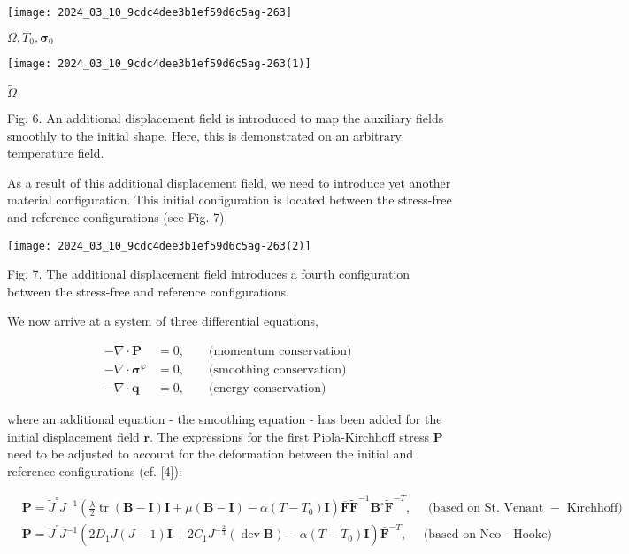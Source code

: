 \documentclass[10pt]{article}
\begin{document}
\begin{center}
\texttt{[image: 2024\_03\_10\_9cdc4dee3b1ef59d6c5ag-263]}
\end{center}

$\Omega, T_{0}, \boldsymbol{\sigma}_{0}$

\begin{center}
\texttt{[image: 2024\_03\_10\_9cdc4dee3b1ef59d6c5ag-263(1)]}
\end{center}

$\tilde{\Omega}$

Fig. 6. An additional displacement field is introduced to map the auxiliary fields smoothly to the initial shape. Here, this is demonstrated on an arbitrary temperature field.

As a result of this additional displacement field, we need to introduce yet another material configuration. This initial configuration is located between the stress-free and reference configurations (see Fig. 7).

\begin{center}
\texttt{[image: 2024\_03\_10\_9cdc4dee3b1ef59d6c5ag-263(2)]}
\end{center}

Fig. 7. The additional displacement field introduces a fourth configuration between the stress-free and reference configurations.

We now arrive at a system of three differential equations,

$$
\begin{aligned}
-\nabla \cdot \mathbf{P} & =0, & & \text { (momentum conservation) } \\
-\nabla \cdot \boldsymbol{\sigma}^{\varphi} & =0, & & \text { (smoothing conservation) } \\
-\nabla \cdot \mathbf{q} & =0, & & \text { (energy conservation) }
\end{aligned}
$$

where an additional equation - the smoothing equation - has been added for the initial displacement field $\mathbf{r}$. The expressions for the first Piola-Kirchhoff stress $\mathbf{P}$ need to be adjusted to account for the deformation between the initial and reference configurations (cf. [4]):

$$
\begin{aligned}
& \mathbf{P}=\tilde{J}^{\circ} J^{-1}\left(\frac{\lambda}{2} \operatorname{tr}(\mathbf{B}-\mathbf{I}) \mathbf{I}+\mu(\mathbf{B}-\mathbf{I})-\alpha\left(T-T_{0}\right) \mathbf{I}\right) \overline{\mathbf{F}} \tilde{\mathbf{F}}^{-1} \mathbf{B}^{\circ} \tilde{\mathbf{F}}^{-T}, \quad \text { (based on St. Venant }- \text { Kirchhoff) } \\
& \mathbf{P}=\tilde{J}^{\circ} J^{-1}\left(2 D_{1} J(J-1) \mathbf{I}+2 C_{1} J^{-\frac{2}{3}}(\operatorname{dev} \mathbf{B})-\alpha\left(T-T_{0}\right) \mathbf{I}\right) \overline{\mathbf{F}}^{-T}, \quad \text { (based on Neo - Hooke) }
\end{aligned}
$$
\end{document}
